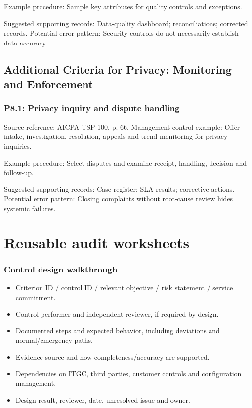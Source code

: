 \documentclass[10pt,oneside]{report}
\begin{document}
Example procedure: Sample key attributes for quality controls and exceptions.

Suggested supporting records: Data-quality dashboard; reconciliations; corrected records. Potential error pattern: Security controls do not necessarily establish data accuracy.

\section{Additional Criteria for Privacy: Monitoring and Enforcement}
\subsection*{P8.1: Privacy inquiry and dispute handling}
Source reference: AICPA TSP 100, p. 66. Management control example: Offer intake, investigation, resolution, appeals and trend monitoring for privacy inquiries.

Example procedure: Select disputes and examine receipt, handling, decision and follow-up.

Suggested supporting records: Case register; SLA results; corrective actions. Potential error pattern: Closing complaints without root-cause review hides systemic failures.

\chapter{Reusable audit worksheets}
\subsection{Control design walkthrough}
\begin{itemize}
\item Criterion ID / control ID / relevant objective / risk statement / service commitment.
\item Control performer and independent reviewer, if required by design.
\item Documented steps and expected behavior, including deviations and normal/emergency paths.
\item Evidence source and how completeness/accuracy are supported.
\item Dependencies on ITGC, third parties, customer controls and configuration management.
\item Design result, reviewer, date, unresolved issue and owner.
\end{itemize}
\end{document}
